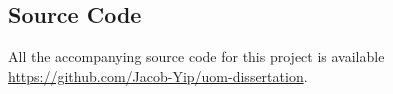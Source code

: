 \documentclass{article}
\begin{document}
\begin{appendices}


    \section{Source Code}
    All the accompanying source code for this project is available 
    \\
    \href{https://github.com/Jacob-Yip/uom-dissertation}{https://github.com/Jacob-Yip/uom-dissertation}. 



\end{appendices}
\end{document}
